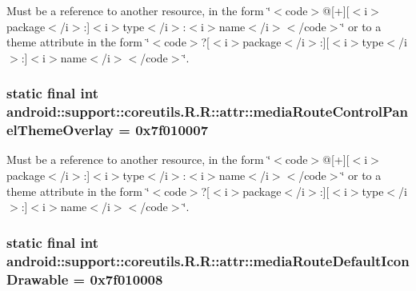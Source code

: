 Must be a reference to another resource, in the form \char`\"{}$<$code$>$@\mbox{[}+\mbox{]}\mbox{[}$<$i$>$package$<$/i$>$:\mbox{]}$<$i$>$type$<$/i$>$:$<$i$>$name$<$/i$>$$<$/code$>$\char`\"{} or to a theme attribute in the form \char`\"{}$<$code$>$?\mbox{[}$<$i$>$package$<$/i$>$:\mbox{]}\mbox{[}$<$i$>$type$<$/i$>$:\mbox{]}$<$i$>$name$<$/i$>$$<$/code$>$\char`\"{}. \hypertarget{classandroid_1_1support_1_1coreutils_1_1_r_1_1attr_0f043050c3608918fcc7badf3c0c87cd}{
\subsubsection[{mediaRouteControlPanelThemeOverlay}]{\setlength{\rightskip}{0pt plus 5cm}static final int android::support::coreutils.R.R::attr::mediaRouteControlPanelThemeOverlay = 0x7f010007}}
\label{classandroid_1_1support_1_1coreutils_1_1_r_1_1attr_0f043050c3608918fcc7badf3c0c87cd}


Must be a reference to another resource, in the form \char`\"{}$<$code$>$@\mbox{[}+\mbox{]}\mbox{[}$<$i$>$package$<$/i$>$:\mbox{]}$<$i$>$type$<$/i$>$:$<$i$>$name$<$/i$>$$<$/code$>$\char`\"{} or to a theme attribute in the form \char`\"{}$<$code$>$?\mbox{[}$<$i$>$package$<$/i$>$:\mbox{]}\mbox{[}$<$i$>$type$<$/i$>$:\mbox{]}$<$i$>$name$<$/i$>$$<$/code$>$\char`\"{}. \hypertarget{classandroid_1_1support_1_1coreutils_1_1_r_1_1attr_bdd8b52659e5aa419681baaa84e3f804}{
\subsubsection[{mediaRouteDefaultIconDrawable}]{\setlength{\rightskip}{0pt plus 5cm}static final int android::support::coreutils.R.R::attr::mediaRouteDefaultIconDrawable = 0x7f010008}}
\label{classandroid_1_1support_1_1coreutils_1_1_r_1_1attr_bdd8b52659e5aa419681baaa84e3f804}


